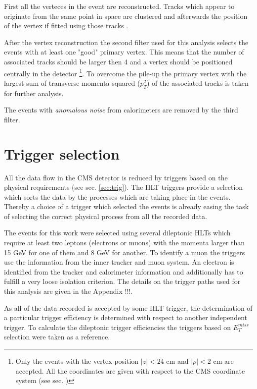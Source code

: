 First all the verteces in the event are reconstructed.
Tracks which appear to originate from the same point in space are clustered and afterwards the position of the vertex if fitted using those tracks \cite{TrackPerf}.

After the vertex reconstruction the second filter used for this analysis selects the events with at least one "good" primary vertex.
This means that the number of associated tracks should be larger then 4 and a vertex should be positioned centrally in the detector
\footnote{Only the events with the vertex position $|z| < \textrm{24 cm}$ and $|\rho| < \textrm{2 cm}$ are accepted. All the coordinates
are given with respect to the CMS coordinate system (see sec.\label{sec:CMS} )}. To overcome the pile-up the primary vertex with the 
largest sum of transverse momenta squared ($p_{T}^{2}$) of the associated tracks is taken for further analysis.

The events with \textit{anomalous noise} from calorimeters are removed by the third filter.

\section{Trigger selection}

All the data flow in the CMS detector is reduced by triggers based on the physical requirements (see sec. \ref{sec:trig}).
The HLT triggers provide a selection which sorts the data by the processes which are taking place in the events. Thereby
a choice of a trigger which selected the events is already easing the task of selecting the correct physical process from
all the recorded data.

The events for this work were selected using several dileptonic HLTs which require at least two leptons (electrons or muons)
with the momenta larger than 15 GeV for one of them and 8 GeV for another. To identify a muon the triggers use the information
from the inner tracker and muon system. An electron is identified from the tracker and calorimeter information and additionally
has to fulfill a very loose isolation criterion. The details on the trigger paths used for this analysis are given in the
Appendix !!!.

As all of the data recorded is accepted by some HLT trigger, the determination of a particular trigger efficiency is determined with 
respect to another independent trigger. To calculate the dileptonic trigger efficiencies the triggers based on $E_{T}^{miss}$ selection
were taken as a reference.

